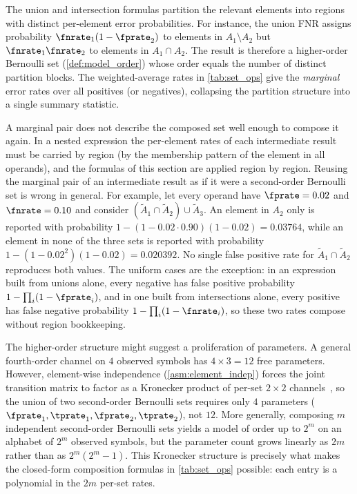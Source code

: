 \begin{remark}
\label{rem:composed_order}
The union and intersection formulas partition the relevant elements into regions with distinct per-element error probabilities.
For instance, the union FNR assigns probability $\fnrate_1(1-\fprate_2)$ to elements in $A_1 \setminus A_2$ but $\fnrate_1 \fnrate_2$ to elements in $A_1 \cap A_2$.
The result is therefore a higher-order Bernoulli set (\cref{def:model_order}) whose order equals the number of distinct partition blocks.
The weighted-average rates in \cref{tab:set_ops} give the \emph{marginal} error rates over all positives (or negatives), collapsing the partition structure into a single summary statistic.
\end{remark}

\begin{remark}
\label{rem:nested}
A marginal pair does not describe the composed set well enough to compose it again.
In a nested expression the per-element rates of each intermediate result must be carried by region (by the membership pattern of the element in all operands), and the formulas of this section are applied region by region.
Reusing the marginal pair of an intermediate result as if it were a second-order Bernoulli set is wrong in general.
For example, let every operand have $\fprate = 0.02$ and $\fnrate = 0.10$ and consider $(\tilde{A}_1 \cap \tilde{A}_2) \cup \tilde{A}_3$.
An element in $A_2$ only is reported with probability $1-(1-0.02 \cdot 0.90)(1-0.02) = 0.03764$, while an element in none of the three sets is reported with probability $1-(1-0.02^2)(1-0.02) = 0.020392$.
No single false positive rate for $\tilde{A}_1 \cap \tilde{A}_2$ reproduces both values.
The uniform cases are the exception: in an expression built from unions alone, every negative has false positive probability $1-\prod_i(1-\fprate_i)$, and in one built from intersections alone, every positive has false negative probability $1-\prod_i(1-\fnrate_i)$, so these two rates compose without region bookkeeping.
\end{remark}

\begin{remark}
\label{rem:parametric_parsimony}
The higher-order structure might suggest a proliferation of parameters.
A general fourth-order channel on $4$ observed symbols has $4 \times 3 = 12$ free parameters.
However, element-wise independence (\cref{asm:element_indep}) forces the joint transition matrix to factor as a Kronecker product of per-set $2 \times 2$ channels~\cite{coverThomas}, so the union of two second-order Bernoulli sets requires only $4$ parameters ($\fprate_1, \tprate_1, \fprate_2, \tprate_2$), not $12$.
More generally, composing $m$ independent second-order Bernoulli sets yields a model of order up to $2^m$ on an alphabet of $2^m$ observed symbols, but the parameter count grows linearly as $2m$ rather than as $2^m(2^m - 1)$.
This Kronecker structure is precisely what makes the closed-form composition formulas in \cref{tab:set_ops} possible: each entry is a polynomial in the $2m$ per-set rates.
\end{remark}

